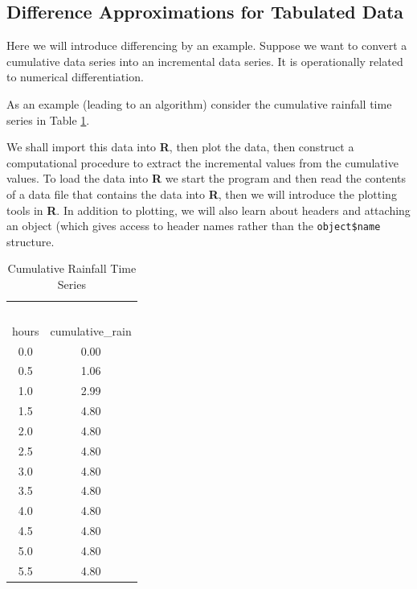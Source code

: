 \subsection{Difference Approximations for Tabulated Data}
Here we will introduce differencing by an example.
Suppose we want to convert a cumulative data series into an incremental data series.  
It is operationally related to numerical differentiation.   

As an example (leading to an algorithm) consider the cumulative rainfall time series in Table \ref{tab:cumulative_rainfall_timeseries}.

We shall import this data into \textbf{R}, then plot the data, then construct a computational procedure to extract the incremental values from the cumulative values.
To load the data into \textbf{R} we start the program and then read the contents of a data file that contains the data into \textbf{R}, then we will introduce the plotting tools in \textbf{R}.
In addition to plotting, we will also learn about headers and attaching an object (which gives access to header names rather than the \texttt{object\$name} structure.

\begin{table}[ht!]
\centering
\caption{Cumulative Rainfall Time Series}
\begin{tabular}{cc} %
~&~\\
  hours & cumulative\_rain\\
  0.0&0.00\\
  0.5&1.06\\
  1.0&2.99\\
 1.5&4.80\\
 2.0&4.80\\
 2.5&4.80\\
 3.0&4.80\\
 3.5&4.80\\
 4.0&4.80\\
 4.5&4.80\\
 5.0&4.80\\
 5.5&4.80\\
\end{tabular}
\label{tab:cumulative_rainfall_timeseries}
\end{table}


